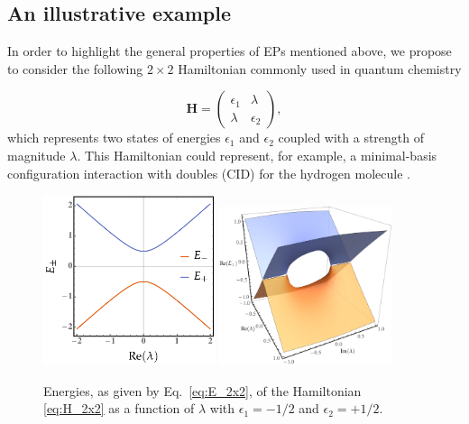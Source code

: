 \documentclass[11pt,a4paper]{article}
\newcommand{\bH}{\mathbf{H}}
\begin{document}
\subsection{An illustrative example}
In order to highlight the general properties of EPs mentioned above, we propose to consider the following $2 \times 2$ Hamiltonian commonly used in quantum chemistry

\begin{equation}
\label{eq:H_2x2}
	\bH = 
	\begin{pmatrix}
		\epsilon_1	&	\lambda	\\
		\lambda		&	\epsilon_2
	\end{pmatrix},
\end{equation}
which represents two states of energies $\epsilon_1$ and $\epsilon_2$ coupled with a strength of magnitude $\lambda$.
This Hamiltonian could represent, for example, a minimal-basis configuration interaction with doubles (CID) for the hydrogen molecule \cite{SzaboBook}.

\begin{figure}[h!]
    \centering
    \includegraphics[width=0.45\textwidth]{2x2.pdf}
    \includegraphics[width=0.45\textwidth]{i2x2.pdf}
    \caption{\centering Energies, as given by Eq.~\eqref{eq:E_2x2}, of the Hamiltonian \eqref{eq:H_2x2} as a function of $\lambda$ with $\epsilon_1 = -1/2$ and $\epsilon_2 = +1/2$.}
    \label{fig:2x2}
\end{figure}
\end{document}
